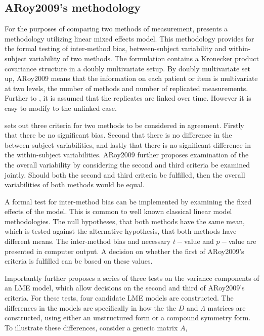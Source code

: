 \documentclass[12pt, a4paper]{report}
\theoremstyle{plain}
\theoremstyle{definition}
\theoremstyle{remark}
\begin{document}
	\newpage
	\subsection{ARoy2009's methodology}
	
	For the purposes of comparing two methods of measurement, \citet{ARoy2009} presents a methodology utilizing linear mixed effects model. This methodology provides for the formal testing of inter-method bias, between-subject variability and within-subject variability of two methods. The formulation contains a Kronecker product covariance structure in a doubly multivariate setup. By doubly multivariate set up, ARoy2009 means that the information on each patient or item is multivariate at two levels, the number of methods and number of replicated measurements. Further to \citet{lam}, it is assumed that the replicates are linked over time. However it is easy to modify to the unlinked case.
	
	\citet{ARoy2009} sets out three criteria for two methods to be considered in agreement. Firstly that there be no significant bias. Second that there is no difference in the between-subject variabilities, and lastly that there is no significant difference in the within-subject variabilities. ARoy2009 further proposes examination of the the overall variability by considering the second and third criteria be examined jointly. Should both the second and third criteria be fulfilled, then the overall variabilities of both methods would be equal.
	
	A formal test for inter-method bias can be implemented by examining the fixed effects of the model. This is common to well known classical linear model methodologies. The null hypotheses, that both methods have the same mean, which is tested against the alternative hypothesis, that both methods have different means.
	The inter-method bias and necessary $t-$value and $p-$value are presented in computer output. A decision on whether the first of ARoy2009's criteria is fulfilled can be based on these values.
	
	Importantly \citet{ARoy2009} further proposes a series of three tests on the variance components of an LME model, which allow decisions on the second and third of ARoy2009's criteria. For these tests, four candidate LME models are constructed. The differences in the models are specifically in how the the $D$ and $\Lambda$ matrices are constructed, using either an unstructured form or a compound symmetry form. To illustrate these differences, consider a generic matrix $A$,
	
\end{document}
